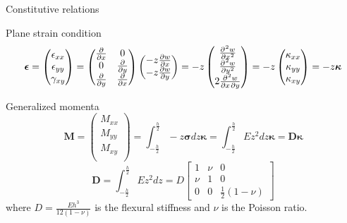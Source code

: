 \documentclass{beamer}
\newcommand{\matr}[1]{\bm{#1}}
\begin{document}
\begin{frame}{Constitutive relations}

Plane strain condition
\begin{equation*}
\bm{\epsilon} =  
\begin{pmatrix}
\epsilon_{xx} \\
\epsilon_{yy} \\
\gamma_{xy} \\
\end{pmatrix}  = 
\begin{pmatrix}
\diffp{}{x} & 0 \\
0 & \diffp{}{y} \\
\diffp{}{y} & \diffp{}{x} \\
\end{pmatrix}
\begin{pmatrix}
-z \diffp{w}{x}\\
-z \diffp{w}{y}\\
\end{pmatrix} = 
-z
\begin{pmatrix}
\diffp[2]{w}{x} \\
\diffp[2]{w}{y} \\
2 \diffp{w}{x,y} \\
\end{pmatrix} = -z
\begin{pmatrix}
\kappa_{xx} \\
\kappa_{yy} \\
\kappa_{xy} \\
\end{pmatrix} = -z \bm{\kappa}
\end{equation*}

Generalized momenta
\begin{equation*}
\bm{M} =
\begin{pmatrix}
M_{xx} \\
M_{yy} \\
M_{xy} \\
\end{pmatrix} = \int_{-\frac{h}{2} }^{\frac{h}{2}}
-z \bm{\sigma} dz \bm{\kappa} =
\int_{-\frac{h}{2} }^{\frac{h}{2}}
E z^2 dz \bm{\kappa}= \bm{D} \bm{\kappa}
\end{equation*}
\begin{equation*}
	\matr{D} = 
	\int_{-\frac{h}{2} }^{\frac{h}{2}}
	E z^2 dz = D 
	\begin{bmatrix}
	1 & \nu & 0 \\ 
	\nu & 1 & 0 \\
	0    & 0 & \frac{1}{2} (1 - \nu)
	\end{bmatrix}
\end{equation*}
where $D = \frac{E h^3}{12 (1 - \nu)}$ is the flexural stiffness and $\nu$ is the Poisson ratio.
\end{frame}
\end{document}
